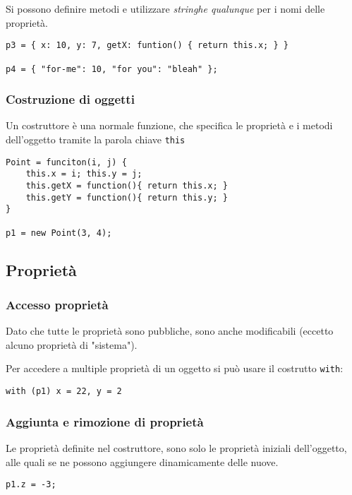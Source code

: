 Si possono definire metodi e utilizzare \textit{stringhe qualunque} per i nomi delle proprietà.
\begin{verbatim}
p3 = { x: 10, y: 7, getX: funtion() { return this.x; } }

p4 = { "for-me": 10, "for you": "bleah" };
\end{verbatim}

\subsubsection{Costruzione di oggetti}
Un costruttore è una normale funzione, che specifica le proprietà e i metodi dell'oggetto tramite la parola chiave \texttt{this}
\begin{verbatim}
Point = funciton(i, j) {
    this.x = i; this.y = j;
    this.getX = function(){ return this.x; }
    this.getY = function(){ return this.y; }
}

p1 = new Point(3, 4);
\end{verbatim}

\subsection{Proprietà}

\subsubsection{Accesso proprietà}
Dato che tutte le proprietà sono pubbliche, sono anche modificabili (eccetto alcuno proprietà di "sistema").

Per accedere a multiple proprietà di un oggetto si può usare il costrutto \texttt{with}:
\begin{verbatim}
with (p1) x = 22, y = 2
\end{verbatim}

\subsubsection{Aggiunta e rimozione di proprietà}
Le proprietà definite nel costruttore, sono solo le proprietà iniziali dell'oggetto, alle quali se ne possono aggiungere dinamicamente delle nuove.
\begin{verbatim}
p1.z = -3;
\end{verbatim}

